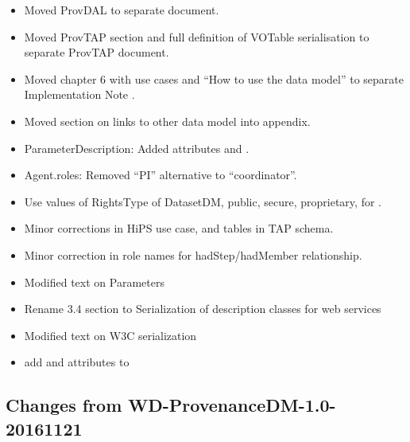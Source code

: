 \begin{itemize}
\item Moved ProvDAL to separate document.
\item Moved ProvTAP section and full definition of VOTable serialisation to separate ProvTAP document.
\item Moved chapter 6 with use cases and ``How to use the data model'' to  separate Implementation Note \citep{std:ProvenanceImplementationNote}.
\item Moved section on links to other data model into appendix.
\item ParameterDescription: Added attributes  and .
\item Agent.roles: Removed ``PI'' alternative to ``coordinator''.
\item Use values of RightsType of DatasetDM, public, secure, proprietary, for .
\item Minor corrections in HiPS use case, 
and tables in TAP schema.
\item Minor correction in role names for hadStep/hadMember relationship.
\item Modified text on Parameters
\item Rename 3.4 section to Serialization of description classes for web services
\item Modified text on W3C serialization
\item add  and  attributes to 
\end{itemize}


\subsection{Changes from WD-ProvenanceDM-1.0-20161121}

